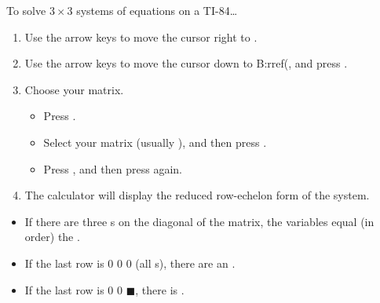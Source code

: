 \begin{center}
\begin{minipage}[t]{1\textwidth}
\begin{myConcept}{To solve $3\times3$ systems of equations on a {TI-84}\dots}
\begin{enumerate}
        \item Use the arrow keys to move the cursor right to {\ttfamily [MATH]}.
        \item Use the arrow keys to move the cursor down to {\ttfamily B:rref(},
            and press .
        \item Choose your matrix.
            \begin{itemize}
                \item Press  .
                \item Select your matrix (usually {\ttfamily [A]}), 
                    and then press .
                \item Press \myButton{)}, and then press  again.
            \end{itemize}
        \item The calculator will display the reduced row-echelon form 
            of the system.
    \end{enumerate}
    \begin{itemize}
        \item If there are three {}s on the diagonal of the matrix, 
            the variables equal (in order) the 
            .
        \item If the last row is { 0 0 0} (all {}s), 
            there are an .
        \item If the last row is { 0 0 $\blacksquare$}, 
            there is .
    \end{itemize}
\end{myConcept}

\end{minipage}
\end{center}
    
    
